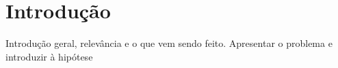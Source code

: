  \iffalse  \fi %

\section*{Introdução}

    Introdução geral, relevância e o que vem sendo feito. Apresentar o problema e introduzir à hipótese

    

















